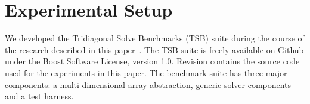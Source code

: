 \documentclass{sig-alternate-05-2015}
\begin{document}
%
%
%
%

\section{Experimental Setup}
\label{sec:experimental_setup:}
We developed the Tridiagonal Solve Benchmarks (TSB) suite during the course of
  the research described in this paper~\cite{tsb_git}.
The TSB suite is freely available on Github under the Boost Software License,
  version 1.0.
Revision  contains the source code used for the experiments in
  this paper.
The benchmark suite has three major components: a multi-dimensional array
  abstraction, generic solver components and a test harness.
\end{document}
